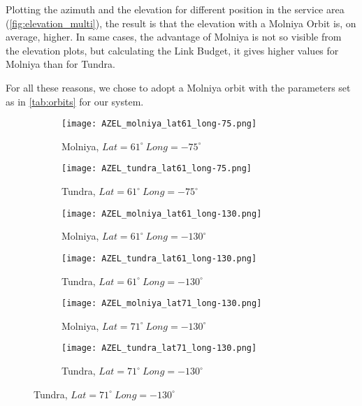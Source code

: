 Plotting the azimuth and the elevation for different position in the service area (\autoref{fig:elevation_multi}), the result is that the elevation with a Molniya Orbit is, on average, higher. In same cases, the advantage of Molniya is not so visible from the elevation plots, but calculating the Link Budget, it gives higher values for Molniya than for Tundra.

For all these reasons, we chose to adopt a Molniya orbit with the parameters set as in \autoref{tab:orbits} for our system.

\begin{figure}[ht]
	\begin{subfigure}{.5\textwidth}
	\centering
	\texttt{[image: AZEL\_molniya\_lat61\_long-75.png]}
	\caption{Molniya, $Lat = 61^\circ ~ Long = -75^\circ$}
	\end{subfigure}
	\begin{subfigure}{.5\textwidth}
	\centering
	\texttt{[image: AZEL\_tundra\_lat61\_long-75.png]}
	\caption{Tundra, $Lat = 61^\circ ~ Long = -75^\circ$}
	\end{subfigure}
	\vspace{0.5cm}
	\begin{subfigure}{.5\textwidth}
	\centering
	\texttt{[image: AZEL\_molniya\_lat61\_long-130.png]}
	\caption{Molniya, $Lat = 61^\circ ~ Long = -130^\circ$}
	\end{subfigure}
	\begin{subfigure}{.5\textwidth}
	\centering
	\texttt{[image: AZEL\_tundra\_lat61\_long-130.png]}
	\caption{Tundra, $Lat = 61^\circ ~ Long = -130^\circ$}
	\end{subfigure}
	\vspace{0.5cm}
	\begin{subfigure}{.5\textwidth}
	\centering
	\texttt{[image: AZEL\_molniya\_lat71\_long-130.png]}
	\caption{Molniya, $Lat = 71^\circ ~ Long = -130^\circ$}
	\end{subfigure}
	\begin{subfigure}{.5\textwidth}
	\centering
	\texttt{[image: AZEL\_tundra\_lat71\_long-130.png]}
	\caption{Tundra, $Lat = 71^\circ ~ Long = -130^\circ$}
	\end{subfigure}
\end{figure}
